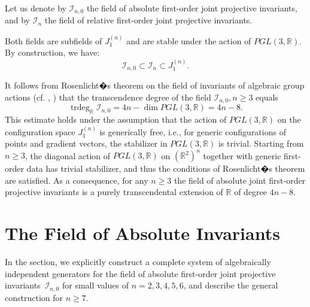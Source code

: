 \documentclass[12pt,reqno]{amsart}
\begin{document}
Let us denote by
$\mathcal{I}_{n,0}$ the field of absolute first-order joint projective invariants, and by 
$\mathcal{I}_n$ the field of relative first-order joint projective invariants.

Both fields are subfields of $J^{(n)}_1$ and are stable under the action of $PGL(3,\mathbb{R})$. By construction, we have:
\[
\mathcal{I}_{n,0} \subset \mathcal{I}_n \subset J_1^{(n)}.
\]


It follows from Rosenlicht�s theorem on the field of invariants of algebraic group actions (cf. \cite{Ros}, \cite{Sp}) that the transcendence degree of the field $\mathcal{I}_{n,0},n \geq 3$   equals
\[
\operatorname{trdeg}_{\mathbb{R}} \mathcal{I}_{n,0} = 4n - \dim PGL(3,\mathbb{R}) = 4n - 8.
\]
This estimate holds under the assumption that the action of $PGL(3,\mathbb{R})$ on the configuration space $J_1^{(n)}$ is {generically free}, i.e., for generic configurations of points and gradient vectors, the stabilizer in $PGL(3,\mathbb{R})$ is trivial. Starting from $n \geq 3$, the diagonal action of $PGL(3,\mathbb{R})$ on $(\mathbb{R}^{2})^n$ together with generic first-order data has trivial stabilizer, and thus the conditions of Rosenlicht�s theorem are satisfied.
As a consequence, for any $n \geq 3$ the field of absolute joint first-order projective invariants is a purely transcendental extension of $\mathbb{R}$ of degree $4n - 8$. 





\section{The Field of Absolute Invariants}

In the section, we explicitly construct a complete system of algebraically independent generators for the field of absolute first-order joint projective invariants~$\mathcal{I}_{n,0}$ for small values of $n = 2, 3, 4, 5, 6$, and describe the general construction for $n \geq 7$.
\end{document}
